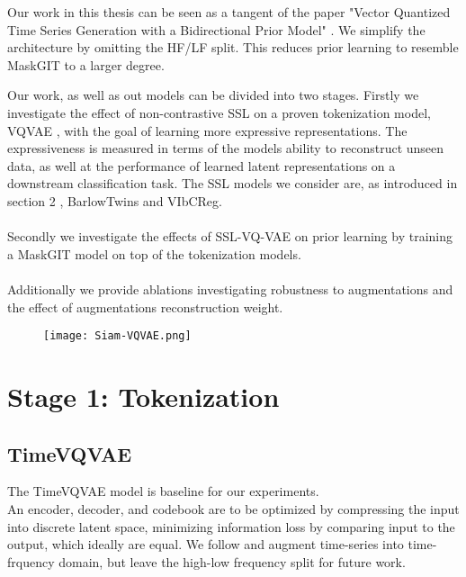 \documentclass[../../thesis.tex]{subfiles}
\begin{document}
Our work in this thesis can be seen as a tangent of the paper "Vector Quantized Time Series Generation with a Bidirectional Prior Model" \cite{TimeVQVAE}. We simplify the architecture by omitting the HF/LF split. This reduces prior learning to resemble MaskGIT to a larger degree. \newline

Our work, as well as out models can be divided into two stages. Firstly we investigate the effect of non-contrastive SSL on a proven tokenization model, VQVAE \cite{VQVAE}, with the goal of learning more expressive representations. The expressiveness is measured in terms of the models ability to reconstruct unseen data, as well at the performance of learned latent representations on a downstream classification task. The SSL models we consider are, as introduced in section 2 , BarlowTwins and VIbCReg.\\\\

Secondly we investigate the effects of SSL-VQ-VAE on prior learning by training a MaskGIT model on top of the tokenization models.\\\\

Additionally we provide ablations investigating robustness to augmentations and the effect of augmentations reconstruction weight. \newline




\begin{figure}[h]
    \texttt{[image: Siam-VQVAE.png]}
    \centering    
\end{figure}


\section{Stage 1: Tokenization}


\subsection{TimeVQVAE}
The TimeVQVAE model is baseline for our experiments.\\

An encoder, decoder, and codebook are to be optimized by compressing the input into discrete latent space, minimizing information loss by comparing input to the output, which ideally are equal. We follow \cite{TimeVQVAE} and augment time-series into time-frquency domain, but leave the high-low frequency split for future work.
\end{document}
